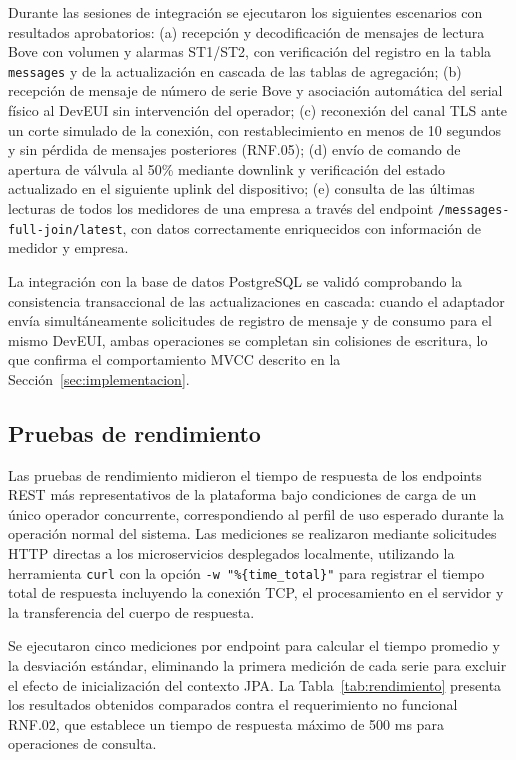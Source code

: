 \documentclass[12pt,a4paper,oneside]{report}
\begin{document}
Durante las sesiones de integración se ejecutaron los siguientes escenarios con resultados aprobatorios: (a) recepción y decodificación de mensajes de lectura Bove con volumen y alarmas ST1/ST2, con verificación del registro en la tabla \texttt{messages} y de la actualización en cascada de las tablas de agregación; (b) recepción de mensaje de número de serie Bove y asociación automática del serial físico al DevEUI sin intervención del operador; (c) reconexión del canal TLS ante un corte simulado de la conexión, con restablecimiento en menos de 10 segundos y sin pérdida de mensajes posteriores (RNF.05); (d) envío de comando de apertura de válvula al 50\% mediante downlink y verificación del estado actualizado en el siguiente uplink del dispositivo; (e) consulta de las últimas lecturas de todos los medidores de una empresa a través del endpoint \texttt{/messages-full-join/latest}, con datos correctamente enriquecidos con información de medidor y empresa.

La integración con la base de datos PostgreSQL se validó comprobando la consistencia transaccional de las actualizaciones en cascada: cuando el adaptador envía simultáneamente solicitudes de registro de mensaje y de consumo para el mismo DevEUI, ambas operaciones se completan sin colisiones de escritura, lo que confirma el comportamiento MVCC descrito en la Sección~\ref{sec:implementacion}.

\subsection{Pruebas de rendimiento}\label{subsec:pruebas-rendimiento}

Las pruebas de rendimiento midieron el tiempo de respuesta de los endpoints REST más representativos de la plataforma bajo condiciones de carga de un único operador concurrente, correspondiendo al perfil de uso esperado durante la operación normal del sistema. Las mediciones se realizaron mediante solicitudes HTTP directas a los microservicios desplegados localmente, utilizando la herramienta \texttt{curl} con la opción \texttt{-w "\%\{time\_total\}"} para registrar el tiempo total de respuesta incluyendo la conexión TCP, el procesamiento en el servidor y la transferencia del cuerpo de respuesta.

Se ejecutaron cinco mediciones por endpoint para calcular el tiempo promedio y la desviación estándar, eliminando la primera medición de cada serie para excluir el efecto de inicialización del contexto JPA. La Tabla~\ref{tab:rendimiento} presenta los resultados obtenidos comparados contra el requerimiento no funcional RNF.02, que establece un tiempo de respuesta máximo de 500 ms para operaciones de consulta.
\end{document}
